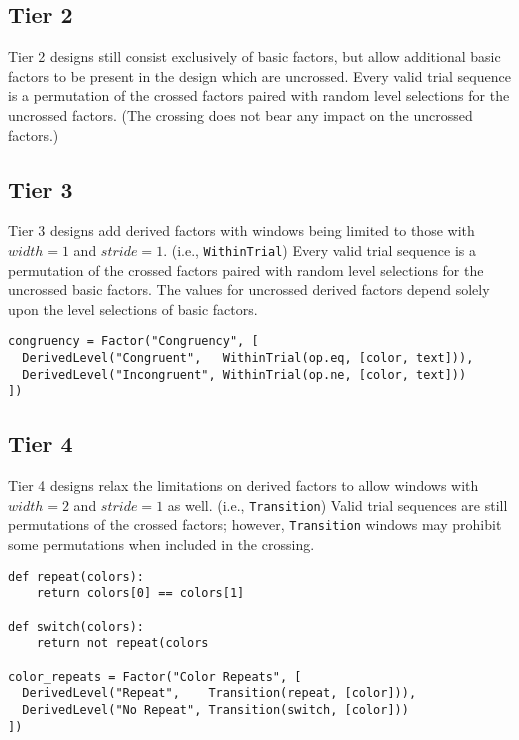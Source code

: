 \subsection{Tier 2}

Tier 2 designs still consist exclusively of basic factors, but allow additional basic factors to be present in the design which are uncrossed. Every valid trial sequence is a permutation of the crossed factors paired with random level selections for the uncrossed factors. (The crossing does not bear any impact on the uncrossed factors.)

\subsection{Tier 3}

Tier 3 designs add derived factors with windows being limited to those with $width=1$ and $stride=1$. (i.e., \texttt{WithinTrial}) Every valid trial sequence is a permutation of the crossed factors paired with random level selections for the uncrossed basic factors. The values for uncrossed derived factors depend solely upon the level selections of basic factors.

\begin{verbatim}
congruency = Factor("Congruency", [
  DerivedLevel("Congruent",   WithinTrial(op.eq, [color, text])),
  DerivedLevel("Incongruent", WithinTrial(op.ne, [color, text]))
])
\end{verbatim}

\subsection{Tier 4}

Tier 4 designs relax the limitations on derived factors to allow windows with $width=2$ and $stride=1$ as well. (i.e., \texttt{Transition}) Valid trial sequences are still permutations of the crossed factors; however, \texttt{Transition} windows may prohibit some permutations when included in the crossing.

\begin{verbatim}
def repeat(colors):
    return colors[0] == colors[1]

def switch(colors):
    return not repeat(colors

color_repeats = Factor("Color Repeats", [
  DerivedLevel("Repeat",    Transition(repeat, [color])),
  DerivedLevel("No Repeat", Transition(switch, [color]))
])
\end{verbatim}

